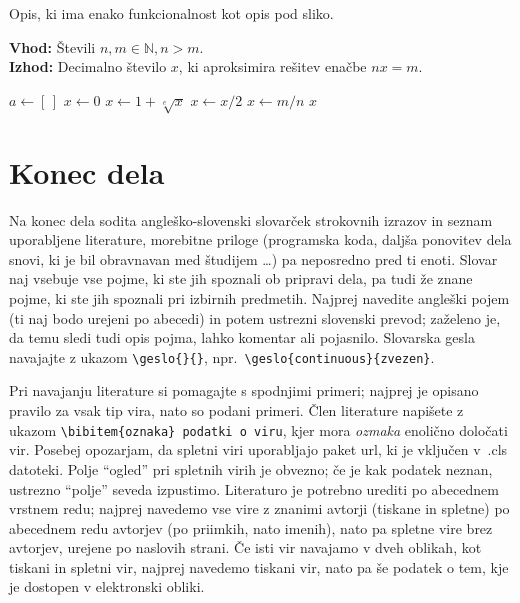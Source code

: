\documentclass[mat1]{fmfdelo}
\newcommand{\N}{\mathbb N}
\begin{document}
\begin{algorithm}[ht]
  \caption{Opis, ki ima enako funkcionalnost kot opis pod sliko.}
  \label{alg:metoda}
  \raggedright
  \textbf{Vhod:} Števili $n, m \in \N, n > m$. \\
  \textbf{Izhod:} Decimalno število $x$, ki aproksimira rešitev enačbe $n x = m$.
  \begin{algorithmic}[1]
     
    \State $a \gets [\,]$ 
        \State {}
      \State {} 
      \Else
        \State {}
      \EndIf
    \EndFor
    \Statex  {}
    \State $x \gets 0$  
      \State $x \gets 1 + \sqrt[e]{x}$
    \EndFor
      \State $x \gets x / 2$
    \EndWhile
    \State $x \gets m / n$ \label{alg:pomembna-vrstica}
    \State \Return $x$  
    \EndFunction
  \end{algorithmic}
\end{algorithm}

\section{Konec dela}

Na konec dela sodita angleško-slovenski slovarček strokovnih izrazov in seznam
uporabljene literature, morebitne priloge (programska koda, daljša ponovitev
dela snovi, ki je bil obravnavan med študijem \dots) pa neposredno pred ti
enoti. Slovar naj vsebuje vse pojme, ki ste jih spoznali ob pripravi dela, pa
tudi že znane pojme, ki ste jih spoznali pri izbirnih predmetih. Najprej
navedite angleški pojem (ti naj bodo urejeni po abecedi) in potem ustrezni
slovenski prevod; zaželeno je, da temu sledi tudi opis pojma, lahko komentar
ali pojasnilo. Slovarska gesla navajajte z ukazom \verb|\geslo{}{}|, npr.\
\verb|\geslo{continuous}{zvezen}|.

Pri navajanju literature si pomagajte s spodnjimi primeri; najprej je opisano
pravilo za vsak tip vira, nato so podani primeri. Člen literature napišete z
ukazom \verb|\bibitem{oznaka} podatki o viru|, kjer mora \emph{ozmaka} enolično
določati vir.  Posebej opozarjam, da spletni viri uporabljajo paket url, ki je
vključen v~.cls datoteki. Polje ``ogled'' pri spletnih virih je obvezno; če je
kak podatek neznan, ustrezno ``polje'' seveda izpustimo. Literaturo je potrebno
urediti po abecednem vrstnem redu; najprej navedemo vse vire z znanimi avtorji
(tiskane in spletne) po abecednem redu avtorjev (po priimkih, nato imenih),
nato pa spletne vire brez avtorjev, urejene po naslovih strani. Če isti vir
navajamo v dveh oblikah, kot tiskani in spletni vir, najprej navedemo tiskani
vir, nato pa še podatek o tem, kje je dostopen v elektronski obliki.
\end{document}
